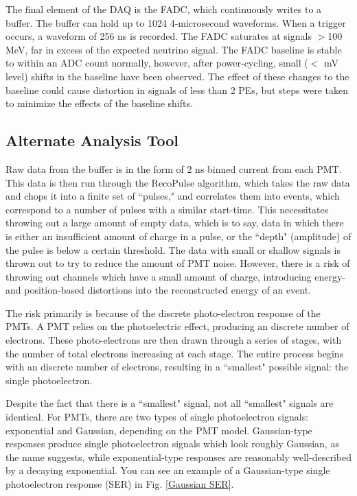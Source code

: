 The final element of the DAQ is the FADC, which continuously writes to a buffer. The buffer can hold up to 1024 4-microsecond waveforms. When a trigger occurs, a waveform of 256 ns is recorded. The FADC saturates at signals $>$100 MeV, far in excess of the expected neutrino signal. The FADC baseline is stable to within an ADC count normally, however, after power-cycling, small ($<$ mV level) shifts in the baseline have been observed. The effect of these changes to the baseline could cause distortion in signals of less than 2 PEs, but steps were taken to minimize the effects of the baseline shifts. 

\subsection{Alternate Analysis Tool}
  Raw data from the buffer is in the form of 2 ns binned current from each PMT. This data is then run through the RecoPulse algorithm, which takes the raw data and chops it into a finite set of ``pulses," and correlates them into events, which correspond to a number of pulses with a similar start-time. This necessitates throwing out a large amount of empty data, which is to say, data in which there is either an insufficient amount of charge in a pulse, or the ``depth" (amplitude) of the pulse is below a certain threshold. The data with small or shallow signals is thrown out to try to reduce the amount of PMT noise. However, there is a risk of throwing out channels which have a small amount of charge, introducing energy- and position-based distortions into the reconstructed energy of an event. 
  
The risk primarily is because of the discrete photo-electron response of the PMTs. A PMT relies on the photoelectric effect,  producing an discrete number of electrons. These photo-electrons are then drawn through a series of stages, with the number of total electrons increasing at each stage. The entire process begins with an discrete number of electrons, resulting in a ``smallest" possible signal: the single photoelectron.

Despite the fact that there is a ``smallest" signal, not all ``smallest" signals are identical. For PMTs, there are two types of single photoelectron signals: exponential and Gaussian, depending on the PMT model. Gaussian-type responses produce single photoelectron signals which look roughly Gaussian, as the name suggests, while exponential-type responses are reasonably well-described by a decaying exponential. You can see an example of a Gaussian-type single photoelectron response (SER) in Fig. \ref{Gaussian SER}. 


